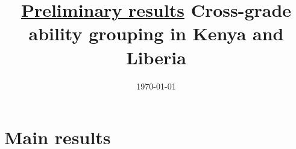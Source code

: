 \documentclass[11pt]{article}
\title{\underline{Preliminary results} \linebreak
	Cross-grade ability grouping in Kenya and Liberia}
\date{\today}
\begin{document}
	\maketitle

\centering

\section*{Main results }

\begin{table}[H]
	
\end{table}


\begin{table}[H]
	
\end{table}

\begin{table}[H]
	
\end{table}

\begin{table}[H]
	
\end{table}

\begin{landscape}
%

\begin{table}[H]

\end{table}

\begin{table}[H]

\end{table}

%

\begin{table}[H]

\end{table}

\begin{table}[H]

\end{table}


\begin{table}[H]

\end{table}


\begin{table}[H]

\end{table}

\end{landscape}
\end{document}
